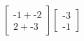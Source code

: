 \documentclass[preview]{standalone}
\begin{document}
\begin{align*}
\begin{bmatrix} \text{-}1 + \text{-}2 \\ 2 + \text{-}3 \end{bmatrix} \begin{bmatrix} \text{-}3 \\ \text{-}1 \end{bmatrix}
\end{align*}
\end{document}
